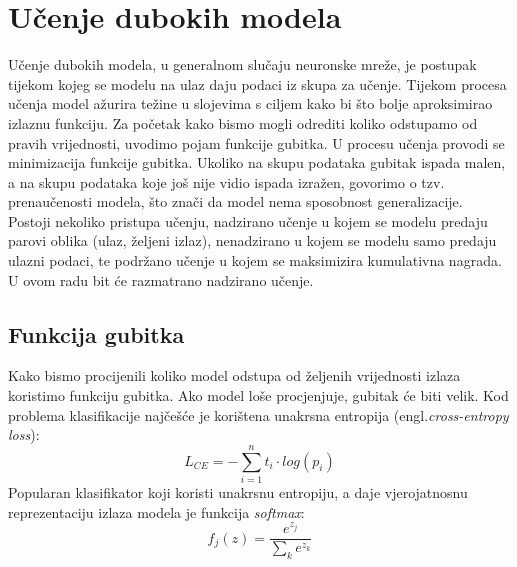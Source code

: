 \documentclass[times, utf8, zavrsni, numeric]{fer}
\begin{document}
\section{Učenje dubokih modela}
Učenje dubokih modela, u generalnom slučaju neuronske mreže, je postupak tijekom kojeg se modelu na ulaz daju podaci iz skupa za učenje. Tijekom procesa učenja model ažurira težine u slojevima s ciljem kako bi što bolje aproksimirao izlaznu funkciju. Za početak kako bismo mogli odrediti koliko odstupamo od pravih vrijednosti, uvodimo pojam funkcije gubitka. U procesu učenja provodi se minimizacija funkcije gubitka. Ukoliko na skupu podataka gubitak ispada malen, a na skupu podataka koje još nije vidio ispada izražen, govorimo o tzv. prenaučenosti modela, što znači da model nema sposobnost generalizacije.\\
Postoji nekoliko pristupa učenju, nadzirano učenje u kojem se modelu predaju parovi oblika (ulaz, željeni izlaz), nenadzirano u kojem se modelu samo predaju ulazni podaci, te podržano učenje u kojem se maksimizira kumulativna nagrada. U ovom radu bit će razmatrano nadzirano učenje.\pagebreak
\subsection{Funkcija gubitka}
Kako bismo procijenili koliko model odstupa od željenih vrijednosti izlaza koristimo funkciju gubitka. Ako model loše procjenjuje, gubitak će biti velik. 
Kod problema klasifikacije najčešće je korištena unakrsna entropija (engl.\textit{cross-entropy loss}):
\begin{equation}
L_{CE}=-\sum_{i=1}^{n}t_{i}\cdot log(p_{i})
\label{eq:Aktivacija}
\end{equation}
Popularan klasifikator koji koristi unakrsnu entropiju, a daje vjerojatnosnu reprezentaciju izlaza modela je funkcija \textit{softmax}:
\begin{equation}
f_{j}(z) = \frac{e^{{z_{j}}}}{\sum_{k}^{}e^{z_{k}}}
\label{eq:Aktivacija}
\end{equation}
\end{document}
